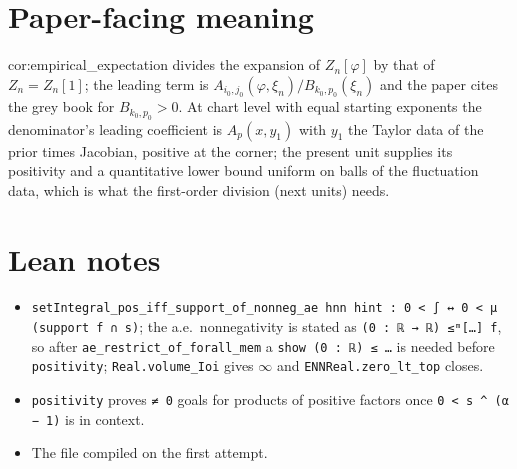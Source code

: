 \documentclass[11pt]{article}
\begin{document}
\section{Paper-facing meaning}
cor:empirical\_expectation divides the expansion of $Z_n[\varphi]$ by that of $Z_n=Z_n[1]$; the
leading term is $A_{i_0,j_0}(\varphi,\xi_n)/B_{k_0,p_0}(\xi_n)$ and the paper cites the grey book for
$B_{k_0,p_0}>0$. At chart level with equal starting exponents the denominator's leading coefficient
is $A_p(x,y_1)$ with $y_1$ the Taylor data of the prior times Jacobian, positive at the corner; the
present unit supplies its positivity and a quantitative lower bound uniform on balls of the
fluctuation data, which is what the first-order division (next units) needs.

\section{Lean notes}
\begin{itemize}
\item \texttt{setIntegral\_pos\_iff\_support\_of\_nonneg\_ae hnn hint : 0 < ∫ ↔ 0 < μ (support f ∩ s)};
the a.e.\ nonnegativity is stated as \texttt{(0 : ℝ → ℝ) ≤ᵐ[…] f}, so after
\texttt{ae\_restrict\_of\_forall\_mem} a \texttt{show (0 : ℝ) ≤ …} is needed before
\texttt{positivity}; \texttt{Real.volume\_Ioi} gives $\infty$ and \texttt{ENNReal.zero\_lt\_top} closes.
\item \texttt{positivity} proves \texttt{≠ 0} goals for products of positive factors once
\texttt{0 < s \^{} (α − 1)} is in context.
\item The file compiled on the first attempt.
\end{itemize}
\end{document}
